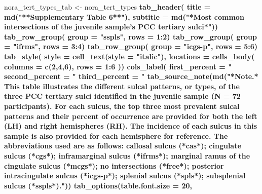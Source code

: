 \documentclass[
]{article}
\newenvironment{Shaded}{\begin{snugshade}}{\end{snugshade}}
\newcommand{\DataTypeTok}[1]{\textcolor[rgb]{0.13,0.29,0.53}{#1}}
\newcommand{\DecValTok}[1]{\textcolor[rgb]{0.00,0.00,0.81}{#1}}
\newcommand{\KeywordTok}[1]{\textcolor[rgb]{0.13,0.29,0.53}{\textbf{#1}}}
\newcommand{\NormalTok}[1]{#1}
\newcommand{\OperatorTok}[1]{\textcolor[rgb]{0.81,0.36,0.00}{\textbf{#1}}}
\newcommand{\StringTok}[1]{\textcolor[rgb]{0.31,0.60,0.02}{#1}}
\begin{document}
\begin{Shaded}
\begin{Highlighting}[]
\NormalTok{nora_tert_types_tab <-}\StringTok{ }\NormalTok{nora_tert_types }\OperatorTok{%>%}\StringTok{ }\KeywordTok{gt}\NormalTok{() }\OperatorTok{%>%}
\KeywordTok{tab_header}\NormalTok{(}
  \DataTypeTok{title =} \KeywordTok{md}\NormalTok{(}\StringTok{"**Supplementary Table 6**"}\NormalTok{),}
  \DataTypeTok{subtitle =} \KeywordTok{md}\NormalTok{(}\StringTok{"*Most common intersections of the juvenile sample's PCC tertiary sulci*"}\NormalTok{)) }\OperatorTok{%>%}
\KeywordTok{tab_row_group}\NormalTok{(}
    \DataTypeTok{group =} \StringTok{"sspls"}\NormalTok{,}
    \DataTypeTok{rows =} \DecValTok{1}\OperatorTok{:}\DecValTok{2}\NormalTok{) }\OperatorTok{%>%}
\KeywordTok{tab_row_group}\NormalTok{(}
    \DataTypeTok{group =} \StringTok{"ifrms"}\NormalTok{,}
    \DataTypeTok{rows =} \DecValTok{3}\OperatorTok{:}\DecValTok{4}\NormalTok{) }\OperatorTok{%>%}
\KeywordTok{tab_row_group}\NormalTok{(}
    \DataTypeTok{group =} \StringTok{"icgs-p"}\NormalTok{,}
    \DataTypeTok{rows =} \DecValTok{5}\OperatorTok{:}\DecValTok{6}\NormalTok{) }\OperatorTok{%>%}
\KeywordTok{tab_style}\NormalTok{(}
    \DataTypeTok{style =} \KeywordTok{cell_text}\NormalTok{(}\DataTypeTok{style =} \StringTok{"italic"}\NormalTok{),}
    \DataTypeTok{locations =} \KeywordTok{cells_body}\NormalTok{(}
      \DataTypeTok{columns =} \KeywordTok{c}\NormalTok{(}\DecValTok{2}\NormalTok{,}\DecValTok{4}\NormalTok{,}\DecValTok{6}\NormalTok{),}
      \DataTypeTok{rows =} \DecValTok{1}\OperatorTok{:}\DecValTok{6}
\NormalTok{    )) }\OperatorTok{%>%}
\KeywordTok{cols_label}\NormalTok{(}
    \DataTypeTok{first_percent =} \StringTok{"%"}\NormalTok{,}
    \DataTypeTok{second_percent =} \StringTok{"%"}\NormalTok{,}
    \DataTypeTok{third_percent =} \StringTok{"%"}\NormalTok{) }\OperatorTok{%>%}
\KeywordTok{tab_source_note}\NormalTok{(}\KeywordTok{md}\NormalTok{(}\StringTok{"*Note.* This table illustrates the different sulcal patterns, or types, of the three PCC tertiary sulci identified in the juvenile sample (N = 72 participants). For each sulcus, the top three most prevalent sulcal patterns and their percent of occurrence are provided for both the left (LH) and right hemispheres (RH). The incidence of each sulcus in this sample is also provided for each hemisphere for reference. The abbreviations used are as follows: callosal sulcus (*cas*); cingulate sulcus (*cgs*); inframarginal sulcus (*ifrms*); marginal ramus of the cingulate sulcus (*mcgs*); no intersections (*free*); posterior intracingulate sulcus (*icgs-p*); splenial sulcus (*spls*); subsplenial sulcus (*sspls*)."}\NormalTok{)) }\OperatorTok{%>%}
\StringTok{  }\KeywordTok{tab_options}\NormalTok{(}\DataTypeTok{table.font.size =} \DecValTok{20}\NormalTok{,}
}}}}}}}}}}
\end{Highlighting}
\end{Shaded}
\end{document}
